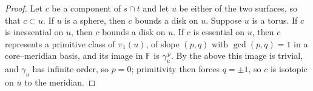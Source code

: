 \documentclass[10pt,a4paper]{amsart}
\newcommand{\FF}{\mathbb{F}}
\begin{document}
\begin{proof}
    Let $c$ be a component of $s \cap t$ and let $u$ be either of the two surfaces, so that $c \subset u$.
    If $u$ is a sphere, then $c$ bounds a disk on $u$.
    Suppose $u$ is a torus.
    If $c$ is inessential on $u$, then $c$ bounds a disk on $u$.
    If $c$ is essential on $u$, then $c$ represents a primitive class of $\pi_1(u)$, of slope $(p,q)$ with $\gcd(p,q) = 1$ in a core--meridian basis, and its image in $\FF$ is $\gamma_u^{\,p}$.
    By the above this image is trivial, and $\gamma_u$ has infinite order, so $p = 0$; primitivity then forces $q = \pm 1$, so $c$ is isotopic on $u$ to the meridian.
\end{proof}
\end{document}
